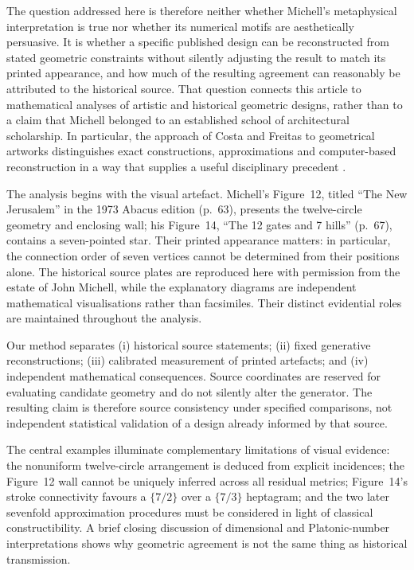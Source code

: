 \documentclass[11pt]{article}
\begin{document}
The question addressed here is therefore neither whether Michell's metaphysical interpretation is true nor whether its numerical motifs are aesthetically persuasive. It is whether a specific published design can be reconstructed from stated geometric constraints without silently adjusting the result to match its printed appearance, and how much of the resulting agreement can reasonably be attributed to the historical source. That question connects this article to mathematical analyses of artistic and historical geometric designs, rather than to a claim that Michell belonged to an established school of architectural scholarship. In particular, the approach of Costa and Freitas to geometrical artworks distinguishes exact constructions, approximations and computer-based reconstruction in a way that supplies a useful disciplinary precedent \citep{costa2015canon}.

The analysis begins with the visual artefact. Michell's Figure~12, titled ``The New Jerusalem'' in the 1973 Abacus edition (p.~63), presents the twelve-circle geometry and enclosing wall; his Figure~14, ``The 12 gates and 7 hills'' (p.~67), contains a seven-pointed star. Their printed appearance matters: in particular, the connection order of seven vertices cannot be determined from their positions alone. The historical source plates are reproduced here with permission from the estate of John Michell, while the explanatory diagrams are independent mathematical visualisations rather than facsimiles. Their distinct evidential roles are maintained throughout the analysis.

Our method separates (i) historical source statements; (ii) fixed generative reconstructions; (iii) calibrated measurement of printed artefacts; and (iv) independent mathematical consequences. Source coordinates are reserved for evaluating candidate geometry and do not silently alter the generator. The resulting claim is therefore source consistency under specified comparisons, not independent statistical validation of a design already informed by that source.

The central examples illuminate complementary limitations of visual evidence: the nonuniform twelve-circle arrangement is deduced from explicit incidences; the Figure~12 wall cannot be uniquely inferred across all residual metrics; Figure~14's stroke connectivity favours a $\{7/2\}$ over a $\{7/3\}$ heptagram; and the two later sevenfold approximation procedures must be considered in light of classical constructibility. A brief closing discussion of dimensional and Platonic-number interpretations shows why geometric agreement is not the same thing as historical transmission.
\end{document}
